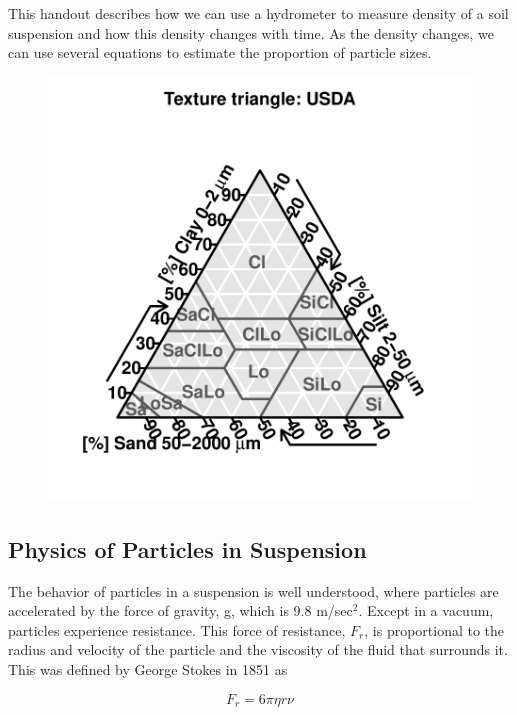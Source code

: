 \documentclass{tufte-handout}
\begin{document}
This handout describes how we can use a hydrometer to measure density of a soil suspension and how this density changes with time. As the density changes, we can use several equations to estimate the proportion of particle sizes. 

\begin{figure}
\includegraphics{Soil_Texture_Analysis_160815-USDATT}
\end{figure}

\subsection{Physics of Particles in Suspension}

The behavior of particles in a suspension is well understood, where particles are accelerated by the force of gravity, g, which is 9.8 m/sec$^2$. Except in a vacuum, particles experience resistance. This force of resistance, $F_r$, is proportional to the radius and velocity of the particle and the viscosity of the fluid that surrounds it. This was defined by George Stokes in 1851 as

\begin{equation}\label{eq:Fr}
F_r = 6\pi \eta r \nu
\end{equation}
\end{document}
